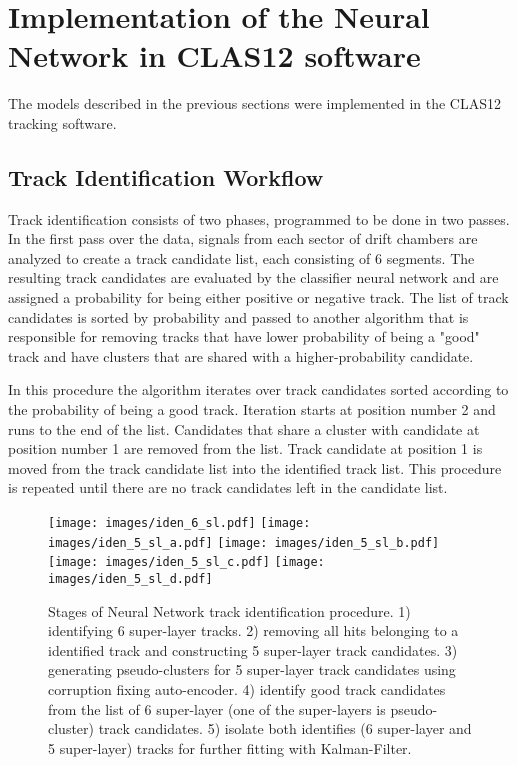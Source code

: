 \section{Implementation of the Neural Network in CLAS12 software}

The models described in the previous sections were implemented in the CLAS12 tracking software. 

\subsection{Track Identification Workflow}

 Track identification consists of two phases, programmed to be done in two passes. In the first pass 
 over the data, signals from each sector of drift chambers are analyzed to create a track candidate list, 
 each consisting of 6 segments. The resulting track candidates are evaluated by the classifier neural 
 network and are assigned a probability for being either positive or negative track. The list of track 
 candidates is sorted by probability and passed to another algorithm that is responsible for removing 
 tracks that have lower probability of being a "good" track and have clusters that are shared with a 
 higher-probability candidate. 

In this procedure the algorithm iterates over track candidates sorted according to the probability of 
being a good track. Iteration starts at position number 2 and runs to the end of the list. Candidates that 
share a cluster with candidate at position number 1 are removed from the list. Track candidate at position 
1 is moved from the track candidate list into the identified track list. This procedure is repeated until 
there are no track candidates left in the candidate list.

 \begin{figure}[!h]
\begin{center}
 \texttt{[image: images/iden\_6\_sl.pdf]}
  \texttt{[image: images/iden\_5\_sl\_a.pdf]}
    \texttt{[image: images/iden\_5\_sl\_b.pdf]}
      \texttt{[image: images/iden\_5\_sl\_c.pdf]}
            \texttt{[image: images/iden\_5\_sl\_d.pdf]}
            
\caption {Stages of Neural Network track identification procedure. 1) identifying 6 super-layer tracks. 2) 
removing all hits belonging to a identified track and constructing 5 super-layer track candidates. 
3) generating pseudo-clusters for 5 super-layer track candidates using corruption fixing auto-encoder. 
4) identify good track candidates from the list of 6 super-layer (one of the super-layers is pseudo-cluster) 
track candidates. 5) isolate both identifies (6 super-layer and 5 super-layer) tracks  for further fitting with 
Kalman-Filter.}
 \label{network:procedure}
 \end{center}
\end{figure}

